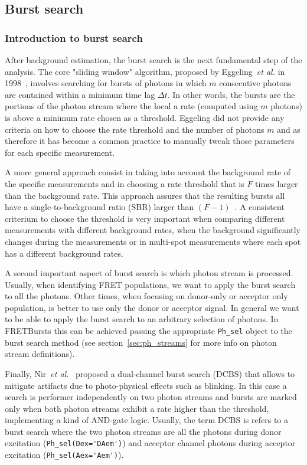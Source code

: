 \subsection{Burst search}
\label{sec:burstsearch}

\subsubsection{Introduction to burst search}
\label{sec:burstsearch_intro}

After background estimation, the burst search is the next fundamental step of the analysis. The core "sliding window" algorithm, proposed by Eggeling~\textit{et al.} in 1998~\cite{Eggeling_1998}, involves searching for bursts of photons
in which $m$ consecutive photons are contained within a minimum time lag $\Delta t$. In other words, the bursts are the portions of the photon stream where the local a rate (computed using $m$ photons) is above a minimum rate chosen as a threshold. Eggeling did not provide any criteria on how to choose the rate threshold and the number of photons $m$ and as therefore it has become a common practice to manually tweak those parameters for each specific measurement. 

A more general approach consist in taking into account the background rate of the specific measurements and in choosing a rate threshold that is $F$ times larger than the background rate. This approach assures that the resulting bursts all have a single-to-background ratio (SBR) larger than $(F-1)$~\cite{Michalet_2012}. A consistent criterium to choose the threshold is very important when comparing different measurements with different background rates, when the background significantly changes during the measurements or in multi-spot measurements where each spot has a different background rates.

A second important aspect of burst search is which photon stream is processed. Usually, when identifying FRET populations, we want to apply the burst search to all the photons. Other times, when focusing on donor-only or acceptor only population, is better to use only the donor or acceptor signal. In general we want to be able to apply the burst search to an arbitrary selection of photons. In FRETBursts this can be achieved passing the appropriate \verb|Ph_sel| object to the burst search method (see section~\ref{sec:ph_streams} for more info on photon stream definitions).

Finally, Nir~\textit{et al.}~\cite{Nir_2006} proposed a dual-channel burst search (DCBS) that allows to mitigate artifacts due to photo-physical effects such as blinking. In this case a search is performer independently on two photon streams and bursts are marked only when both photon streams exhibit a rate higher than the threshold, 
implementing a kind of AND-gate logic. 
Usually, the term DCBS is refers to a burst search where the two photon streams are all the photons 
during donor excitation (\verb|Ph_sel(Dex='DAem')|) and acceptor channel photons during acceptor 
excitation (\verb|Ph_sel(Aex='Aem')|).

